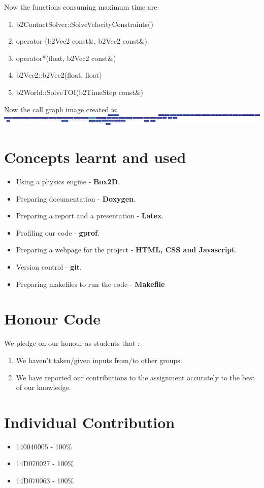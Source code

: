 \documentclass{report}
\begin{document}
Now the functions consuming maximum time are:
\begin{enumerate}
\item b2ContactSolver::SolveVelocityConstraints()
\item operator-(b2Vec2 const\&, b2Vec2 const\&)
\item operator*(float, b2Vec2 const\&)
\item b2Vec2::b2Vec2(float, float)
\item b2World::SolveTOI(b2TimeStep const\&)
\end{enumerate}

Now the call graph image created is:\\
\includegraphics[scale=0.05]{performancenew}\\

\section{Concepts learnt and used}
\begin{itemize}
\item Using a physics engine - \textbf{Box2D}.
\item Preparing documentation - \textbf{Doxygen}.
\item Preparing a report and a presentation - \textbf{Latex}.
\item Profiling our code - \textbf{gprof}.
\item Preparing a webpage for the project - \textbf{HTML, CSS and Javascript}.
\item Version control - \textbf{git}.
\item Preparing makefiles to run the code - \textbf{Makefile}
\end{itemize}

\section{Honour Code}
We pledge on our honour as students that : 
\begin{enumerate}
\item We haven't taken/given inputs from/to other groups.
\item We have reported our contributions to the assignment accurately to the best of our knowledge.
\end{enumerate}

\section{Individual Contribution}
\begin{itemize}
\item 140040005 - 100\% 
\item 14D070027 - 100\% 
\item 14D070063 - 100\% 
\end{itemize}
\end{document}
